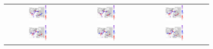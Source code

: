 \begin{figure}[ht]
  \centering
  \begin{tabular}{ccc}
    \includegraphics[width=0.3\textwidth]{images/plot_000.png} &
    \includegraphics[width=0.3\textwidth]{images/plot_001.png} &
    \includegraphics[width=0.3\textwidth]{images/plot_002.png} \\
    \includegraphics[width=0.3\textwidth]{images/plot_003.png} &
    \includegraphics[width=0.3\textwidth]{images/plot_004.png} &
    \includegraphics[width=0.3\textwidth]{images/plot_005.png} \\

\end{tabular}
\end{figure}
